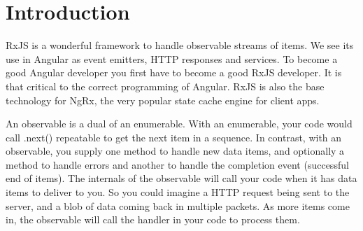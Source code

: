 \section{Introduction}

RxJS is a wonderful framework to handle observable streams of items. We see its use
in Angular as event emitters, HTTP responses and services. To become a good Angular
developer you first have to become a good RxJS developer. It is that critical to the
correct programming of Angular. RxJS is also the base technology for NgRx, the very
popular state cache engine for client apps.

An observable is a dual of an enumerable. With an enumerable, your code would
call .next() repeatable to get the next item in a sequence. In contrast, with an
observable, you supply one method to handle new data items, and optionally a
method to handle errors and another to handle the completion event (successful end
of items). The internals of the observable will call your code when it has data items to
deliver to you. So you could imagine a HTTP request being sent to the server, and a
blob of data coming back in multiple packets. As more items come in, the observable
will call the handler in your code to process them.
